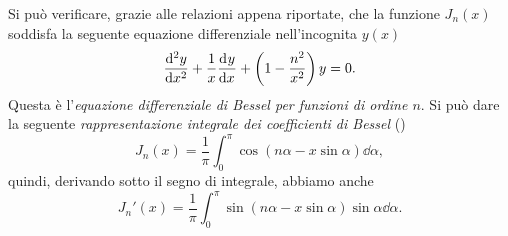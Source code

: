 Si può verificare, grazie alle relazioni appena riportate, che la funzione
$J_n(x)$ soddisfa la seguente equazione differenziale nell'incognita $y(x)$
\begin{equation}
  \toder[2]{y}{x} + \frac{1}{x}\toder{y}{x} +
  \left(
    1 - \frac{n^2}{x^2}
  \right)y = 0.
\end{equation}
Questa è l'\emph{equazione differenziale di Bessel per funzioni di ordine
  $n$}.
Si può dare la seguente \emph{rappresentazione integrale dei coefficienti di
  Bessel} (\textcites[20]{watson:bessel}[362]{whittaker:modern-analysis})
\begin{equation}
  \label{eq:bessel-integrale}
  J_n(x) = \frac{1}{\pi} \int_0^\pi\cos(n\alpha - x\sin\alpha)\dd\alpha,
\end{equation}
quindi, derivando sotto il segno di integrale, abbiamo anche
\begin{equation}
  \label{eq:bessel-derivata-integrale}
  J_n'(x) = \frac{1}{\pi}\int_0^\pi\sin(n\alpha - x\sin\alpha)
  \sin\alpha\dd\alpha.
\end{equation}

